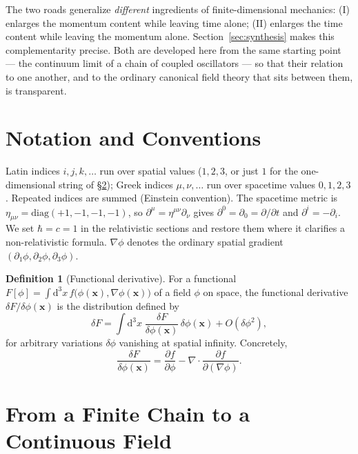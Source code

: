 \documentclass[11pt]{book}
\newcommand{\rd}{\mathrm{d}}
\newcommand{\pdv}[2]{\dfrac{\partial #1}{\partial #2}}
\newcommand{\fdv}[2]{\dfrac{\delta #1}{\delta #2}}
\theoremstyle{definition}
\newtheorem{definition}{Definition}[section]
\theoremstyle{remark}
\begin{document}
The two roads generalize \emph{different} ingredients of finite-dimensional mechanics: (I) enlarges the momentum content while leaving time alone; (II) enlarges the time content while leaving the momentum alone. Section~\ref{sec:synthesis} makes this complementarity precise. Both are developed here from the same starting point --- the continuum limit of a chain of coupled oscillators --- so that their relation to one another, and to the ordinary canonical field theory that sits between them, is transparent.

\section{Notation and Conventions}

Latin indices $i,j,k,\dots$ run over spatial values ($1,2,3$, or just $1$ for the one-dimensional string of \S\ref{sec:continuum-limit}); Greek indices $\mu,\nu,\dots$ run over spacetime values $0,1,2,3$. Repeated indices are summed (Einstein convention). The spacetime metric is $\eta_{\mu\nu}=\mathrm{diag}(+1,-1,-1,-1)$, so $\partial^\mu=\eta^{\mu\nu}\partial_\nu$ gives $\partial^0=\partial_0=\partial/\partial t$ and $\partial^i=-\partial_i$. We set $\hbar=c=1$ in the relativistic sections and restore them where it clarifies a non-relativistic formula. $\nabla\phi$ denotes the ordinary spatial gradient $(\partial_1\phi,\partial_2\phi,\partial_3\phi)$.

\begin{definition}[Functional derivative]
\label{def:funcderiv}
For a functional $F[\phi]=\int \rd^3x\, f\big(\phi(\mathbf{x}),\nabla\phi(\mathbf{x})\big)$ of a field $\phi$ on space, the functional derivative $\delta F/\delta\phi(\mathbf{x})$ is the distribution defined by
\begin{equation}
\delta F = \int \rd^3x\; \fdv{F}{\phi(\mathbf{x})}\,\delta\phi(\mathbf{x}) + O(\delta\phi^2),
\end{equation}
for arbitrary variations $\delta\phi$ vanishing at spatial infinity. Concretely,
\begin{equation}
\fdv{F}{\phi(\mathbf{x})} = \pdv{f}{\phi} - \nabla\cdot\pdv{f}{(\nabla\phi)}.
\end{equation}
\end{definition}

\section{From a Finite Chain to a Continuous Field}
\label{sec:continuum-limit}
\end{document}
